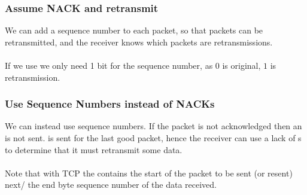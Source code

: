 \documentclass{report}
\begin{document}
\subsubsection*{Assume NACK and retransmit}
We can add a sequence number to each packet, so that packets can be retransmitted, and the receiver knows which packets are retransmissions.
\\
\\ If we use  we only need 1 bit for the sequence number, as $0$ is original, $1$ is retransmission.

\subsubsection*{Use Sequence Numbers instead of NACKs}
We can instead use sequence numbers. If the packet is not acknowledged then an  is not sent.  is sent for the last good packet, hence the receiver can use a lack of s to determine that it must retransmit some data.
\\
\\ Note that with TCP the  contains the start of the packet to be sent (or resent) next/ the end  byte sequence number of the data received.
\end{document}
